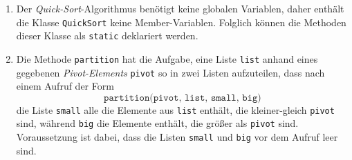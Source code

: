 \begin{enumerate}
\item Der \emph{Quick-Sort}-Algorithmus ben\"otigt keine globalen Variablen,
      daher enth\"alt die Klasse \texttt{QuickSort} keine Member-Variablen.
      Folglich k\"onnen die Methoden dieser Klasse als \texttt{static}
      deklariert werden.
\item Die Methode \texttt{partition} hat die Aufgabe, eine Liste \texttt{list} anhand eines
      gegebenen \emph{Pivot-Elements} \texttt{pivot} so in zwei Listen aufzuteilen, dass nach einem
      Aufruf der Form 
      \[ \texttt{partition(pivot, list, small, big)} \]
      die Liste \texttt{small} alle die Elemente aus 
      \texttt{list} enth\"alt, die kleiner-gleich \texttt{pivot} sind, w\"ahrend \texttt{big}
      die Elemente enth\"alt, die gr\"o\ss{}er als \texttt{pivot} sind.
      Voraussetzung ist dabei, dass die Listen \texttt{small} und \texttt{big} vor dem
      Aufruf leer sind.  


\end{enumerate}

